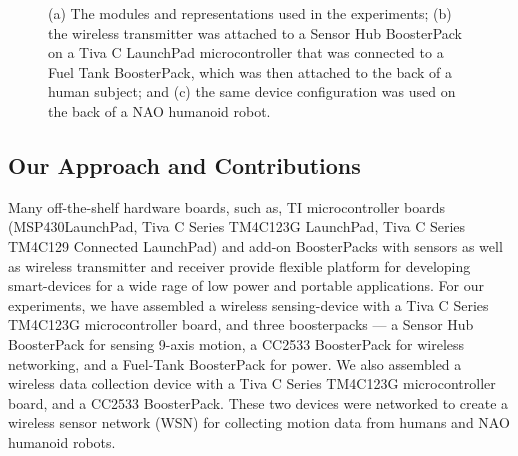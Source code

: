 \documentclass[letterpaper]{article}
\begin{document}
\begin{sloppy}
\begin{figure}[!t]
\centering
{}
\caption{(a) The modules and representations used in the experiments;  (b) the wireless transmitter 
was attached to a Sensor Hub BoosterPack on a Tiva C LaunchPad microcontroller that was connected 
to a Fuel Tank BoosterPack, which was then attached to the back of a human subject; and (c) the 
same device configuration was used on the back of a NAO humanoid robot.}
 \label{fig:framework}
\end{figure}

\subsection{Our Approach and Contributions}

Many off-the-shelf hardware boards, such as, TI microcontroller boards (MSP430{\texttrademark}LaunchPad, Tiva{\texttrademark} C Series 
TM4C123G LaunchPad, Tiva C Series TM4C129 Connected LaunchPad) and add-on  BoosterPacks   with sensors as well as  wireless transmitter and receiver  provide flexible platform for 
developing smart-devices for a wide rage of low power and portable applications. For our experiments, 
we have assembled a wireless sensing-device with a Tiva C Series TM4C123G microcontroller board, and three 
boosterpacks --- a
Sensor Hub BoosterPack  for sensing 9-axis motion,  a CC2533  BoosterPack for wireless 
networking, and a Fuel-Tank BoosterPack for power. We also assembled a wireless data collection device with a Tiva C Series TM4C123G microcontroller board, and a  CC2533  BoosterPack. These two devices were networked to create a wireless sensor network (WSN) for 
collecting motion data from  humans and NAO humanoid robots.   


\end{sloppy}
\end{document}
